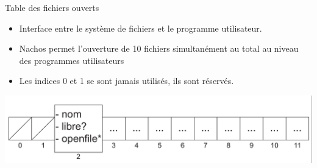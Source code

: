 \documentclass{beamer}
\begin{document}
\begin{frame}
	\begin{block}{Table des fichiers ouverts}
		\begin{itemize}
			\item<1-> Interface entre le système de fichiers et le programme utilisateur.
			\item<1-> Nachos permet l'ouverture de 10 fichiers simultanément au total au niveau des programmes utilisateurs
			\item<1-> Les indices 0 et 1 se sont jamais utilisés, ils sont réservés.
		\end{itemize}		
	\end{block}	
  	\begin{center}
	  	\includegraphics[scale=0.2]{images/FS2.png}
  	\end{center}	
\end{frame}
\end{document}
